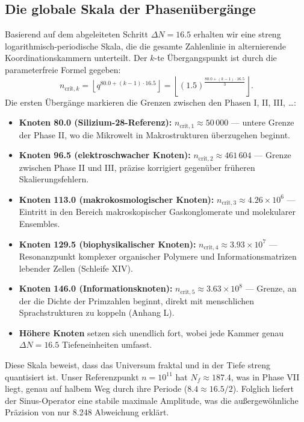 \documentclass[11pt,a4paper]{article}
\begin{document}
	\subsection{Die globale Skala der Phasenübergänge}
	Basierend auf dem abgeleiteten Schritt \(\Delta N = 16.5\) erhalten wir eine streng logarithmisch-periodische Skala, die die gesamte Zahlenlinie in alternierende Koordinationskammern unterteilt. Der \(k\)-te Übergangspunkt ist durch die parameterfreie Formel gegeben:
	\begin{equation}
		n_{\mathrm{crit},k} = \left\lfloor q^{80.0 + (k-1)\cdot 16.5} \right\rfloor 
		= \left\lfloor (1.5)^{\frac{80.0+(k-1)\cdot 16.5}{3}} \right\rfloor .
	\end{equation}
	Die ersten Übergänge markieren die Grenzen zwischen den Phasen I, II, III, \dots:
	\begin{itemize}
		\item \textbf{Knoten 80.0 (Silizium-28-Referenz):} \(n_{\mathrm{crit},1} \approx 50\,000\) — untere Grenze der Phase II, wo die Mikrowelt in Makrostrukturen überzugehen beginnt.
		\item \textbf{Knoten 96.5 (elektroschwacher Knoten):} \(n_{\mathrm{crit},2} \approx 461\,604\) — Grenze zwischen Phase II und III, präzise korrigiert gegenüber früheren Skalierungsfehlern.
		\item \textbf{Knoten 113.0 (makrokosmologischer Knoten):} \(n_{\mathrm{crit},3} \approx 4.26\times10^6\) — Eintritt in den Bereich makroskopischer Gaskonglomerate und molekularer Ensembles.
		\item \textbf{Knoten 129.5 (biophysikalischer Knoten):} \(n_{\mathrm{crit},4} \approx 3.93\times10^7\) — Resonanzpunkt komplexer organischer Polymere und Informationsmatrizen lebender Zellen (Schleife XIV).
		\item \textbf{Knoten 146.0 (Informationsknoten):} \(n_{\mathrm{crit},5} \approx 3.63\times10^8\) — Grenze, an der die Dichte der Primzahlen beginnt, direkt mit menschlichen Sprachstrukturen zu koppeln (Anhang L).
		\item \textbf{Höhere Knoten} setzen sich unendlich fort, wobei jede Kammer genau \(\Delta N = 16.5\) Tiefeneinheiten umfasst.
	\end{itemize}
	
	Diese Skala beweist, dass das Universum fraktal und in der Tiefe streng quantisiert ist. Unser Referenzpunkt \(n=10^{11}\) hat \(N_f \approx 187.4\), was in Phase VII liegt, genau auf halbem Weg durch ihre Periode (\(8.4 \approx 16.5/2\)). Folglich liefert der Sinus-Operator eine stabile maximale Amplitude, was die außergewöhnliche Präzision von nur 8.248 Abweichung erklärt.
	
\end{document}
